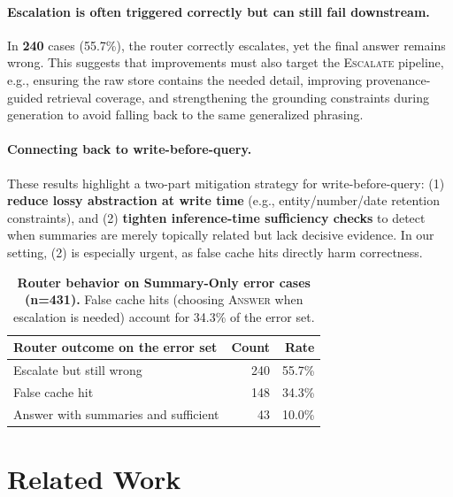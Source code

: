 \documentclass{article}
\theoremstyle{plain}
\theoremstyle{definition}
\theoremstyle{remark}
\begin{document}
\paragraph{Escalation is often triggered correctly but can still fail downstream.}
In \textbf{240} cases (55.7\%), the router correctly escalates, yet the final answer remains wrong.
This suggests that improvements must also target the \textsc{Escalate} pipeline, e.g., ensuring the raw store contains the needed detail, improving provenance-guided retrieval coverage, and strengthening the grounding constraints during generation to avoid falling back to the same generalized phrasing.

\paragraph{Connecting back to write-before-query.}
These results highlight a two-part mitigation strategy for write-before-query:
(1) \textbf{reduce lossy abstraction at write time} (e.g., entity/number/date retention constraints), and
(2) \textbf{tighten inference-time sufficiency checks} to detect when summaries are merely topically related but lack decisive evidence.
In our setting, (2) is especially urgent, as false cache hits directly harm correctness.

\begin{table}[t]
\centering
\small
\setlength{\tabcolsep}{6pt}
\caption{\textbf{Router behavior on Summary-Only error cases (n=431).}
False cache hits (choosing \textsc{Answer} when escalation is needed) account for 34.3\% of the error set.
}
\label{tab:router_on_summary_only_errors}
\begin{tabular}{lrr}
\toprule
\textbf{Router outcome on the error set} & \textbf{Count} & \textbf{Rate} \\
\midrule
Escalate but still wrong  & 240 & 55.7\% \\
False cache hit  & 148 & 34.3\% \\
Answer with summaries and sufficient  & 43 & 10.0\% \\
\bottomrule
\end{tabular}
\end{table}




\section{Related Work}
\end{document}
